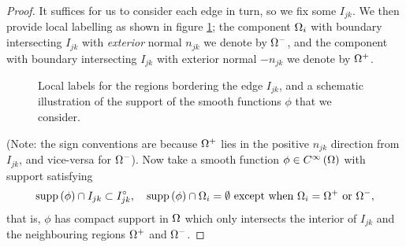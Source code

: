 \documentclass[11pt]{report}
\begin{document}
\begin{proof}
	It suffices for us to consider each edge in turn, so we fix some $I_{jk}$.
	We then provide local labelling as shown in figure \ref{fig:EdgeLocalLabels}; the component $\Omega_i$ with boundary intersecting $I_{jk}$ with \emph{exterior} normal $n_{jk}$ we denote by $\Omega^-$, and the component with boundary intersecting $I_{jk}$ with exterior normal $-n_{jk}$ we denote by $\Omega^+$.
	\begin{figure}[h]
		\centering
		\caption{\label{fig:EdgeLocalLabels} Local labels for the regions bordering the edge $I_{jk}$, and a schematic illustration of the support of the smooth functions $\phi$ that we consider.}
	\end{figure}
	(Note: the sign conventions are because $\Omega^+$ lies in the positive $n_{jk}$ direction from $I_{jk}$, and vice-versa for $\Omega^-$).
	Now take a smooth function $\phi\in C^{\infty}\left( \Omega \right)$ with support satisfying
	\begin{align} \label{eq:PhiProperties}
		\mathrm{supp}\left( \phi \right)\cap I_{jk}\subset I_{jk}^{\circ},
		\quad \mathrm{supp}\left( \phi \right) \cap \Omega_i = \emptyset \text{ except when } \Omega_i = \Omega^+ \text{ or } \Omega^-,
	\end{align}
	that is, $\phi$ has compact support in $\Omega$ which only intersects the interior of $I_{jk}$ and the neighbouring regions $\Omega^+$ and $\Omega^-$.
	

\end{proof}
\end{document}
